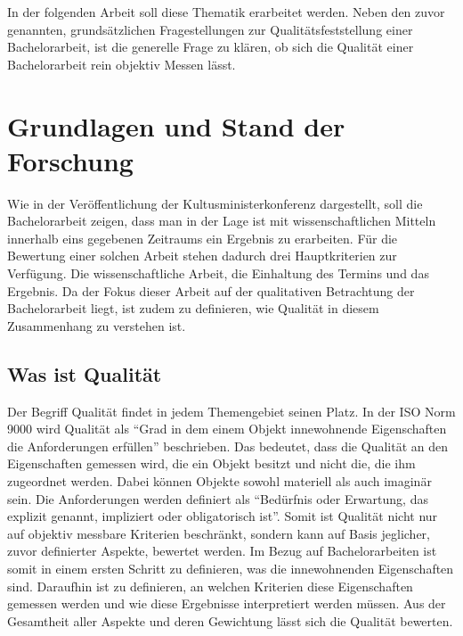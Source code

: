 In der folgenden Arbeit soll diese Thematik erarbeitet werden. Neben den zuvor genannten, grundsätzlichen Fragestellungen zur Qualitätsfeststellung einer Bachelorarbeit, ist die generelle Frage zu klären, ob sich die Qualität einer Bachelorarbeit rein objektiv Messen lässt. 


\section{Grundlagen und Stand der Forschung}
Wie in der Veröffentlichung der Kultusministerkonferenz dargestellt, soll die Bachelorarbeit zeigen, dass man in der Lage ist mit wissenschaftlichen Mitteln innerhalb eins gegebenen Zeitraums ein Ergebnis zu erarbeiten. Für die Bewertung einer solchen Arbeit stehen dadurch drei Hauptkriterien zur Verfügung. Die wissenschaftliche Arbeit, die Einhaltung des Termins und das Ergebnis. Da der Fokus dieser Arbeit auf der qualitativen Betrachtung der Bachelorarbeit liegt, ist zudem zu definieren, wie Qualität in diesem Zusammenhang zu verstehen ist.
\subsection{Was ist Qualität}
Der Begriff Qualität findet in jedem Themengebiet seinen Platz. In der \ac{ISO} Norm 9000 wird Qualität als \enquote{Grad in dem einem Objekt innewohnende Eigenschaften die Anforderungen erfüllen}\cite[Vgl.][Kapitel 3.6.2]{iso9000:2015} beschrieben. Das bedeutet, dass die Qualität an den Eigenschaften gemessen wird, die ein Objekt besitzt und nicht die, die ihm zugeordnet werden. Dabei können Objekte sowohl materiell als auch imaginär sein. Die Anforderungen werden definiert als \enquote{Bedürfnis oder Erwartung, das explizit genannt, impliziert oder obligatorisch ist}\cite[Vgl.][Kapitel 3.6.4]{iso9000:2015}. Somit ist Qualität nicht nur auf objektiv messbare Kriterien beschränkt, sondern kann auf Basis jeglicher, zuvor definierter Aspekte, bewertet werden. Im Bezug auf Bachelorarbeiten ist somit in einem ersten Schritt zu definieren, was die innewohnenden Eigenschaften sind. Daraufhin ist zu definieren, an welchen Kriterien diese Eigenschaften gemessen werden und wie diese Ergebnisse interpretiert werden müssen. Aus der Gesamtheit aller Aspekte und deren Gewichtung lässt sich die Qualität bewerten.

